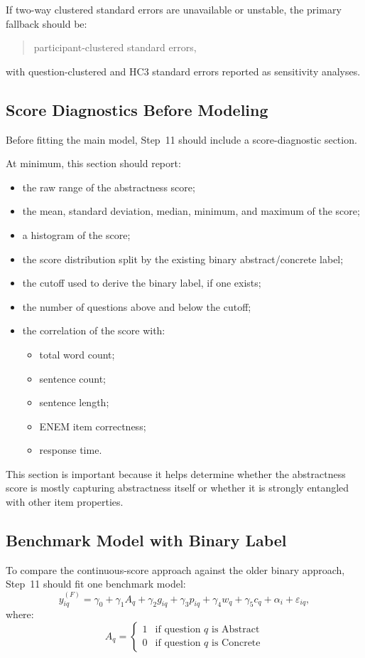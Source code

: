 If two-way clustered standard errors are unavailable or unstable, the primary fallback should be:
\begin{quote}
participant-clustered standard errors,
\end{quote}
with question-clustered and HC3 standard errors reported as sensitivity analyses.

\subsection{Score Diagnostics Before Modeling}
Before fitting the main model, Step~11 should include a score-diagnostic section.

At minimum, this section should report:
\begin{itemize}
    \item the raw range of the abstractness score;
    \item the mean, standard deviation, median, minimum, and maximum of the score;
    \item a histogram of the score;
    \item the score distribution split by the existing binary abstract/concrete label;
    \item the cutoff used to derive the binary label, if one exists;
    \item the number of questions above and below the cutoff;
    \item the correlation of the score with:
    \begin{itemize}
        \item total word count;
        \item sentence count;
        \item sentence length;
        \item ENEM item correctness;
        \item response time.
    \end{itemize}
\end{itemize}

This section is important because it helps determine whether the abstractness score is mostly capturing
abstractness itself or whether it is strongly entangled with other item properties.

\subsection{Benchmark Model with Binary Label}
To compare the continuous-score approach against the older binary approach, Step~11 should fit one benchmark model:
\begin{equation}
y^{(F)}_{iq}
=
\gamma_0
+
\gamma_1 A_q
+
\gamma_2 g_{iq}
+
\gamma_3 p_{iq}
+
\gamma_4 w_q
+
\gamma_5 c_q
+
\alpha_i
+
\varepsilon_{iq},
\end{equation}
where:
\begin{equation}
A_q =
\begin{cases}
1 & \text{if question } q \text{ is Abstract} \\
0 & \text{if question } q \text{ is Concrete}
\end{cases}
\end{equation}

